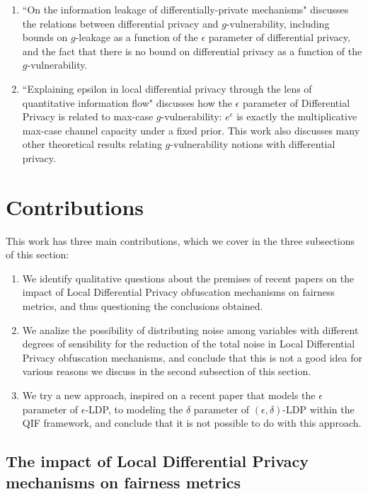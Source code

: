 \documentclass[conference]{IEEEtran}
\newcommand{\qm}[1]{``#1"}
\begin{document}
\begin{enumerate}
	\item \qm{On the information leakage of differentially-private mechanisms} \cite{alvim2015information} discusses the relations between differential privacy and $g$-vulnerability, including bounds on $g$-leakage as a function of the $\epsilon$ parameter of differential privacy, and the fact that there is no bound on differential privacy as a function of the $g$-vulnerability.
	\item \qm{Explaining epsilon in local differential privacy through the lens of quantitative information flow} \cite{fernandes2022explaining} discusses how the $\epsilon$ parameter of Differential Privacy is related to max-case $g$-vulnerability: $e^\epsilon$ is exactly the multiplicative max-case channel capacity under a fixed prior. This work also discusses many other theoretical results relating $g$-vulnerability notions with differential privacy.
\end{enumerate}

\section{Contributions}
This work has three main contributions, which we cover in the three subsections of this section:

\begin{enumerate}
	\item We identify qualitative questions about the premises of recent papers on the impact of Local Differential Privacy obfuscation mechanisms on fairness metrics, and thus questioning the conclusions obtained.
	\item We analize the possibility of distributing noise among variables with different degrees of sensibility for the reduction of the total noise in Local Differential Privacy obfuscation mechanisms, and conclude that this is not a good idea for various reasons we discuss in the second subsection of this section.
	\item We try a new approach, inspired on a recent paper \cite{fernandes2022explaining} that models the $\epsilon$ parameter of $\epsilon$-LDP, to modeling the $\delta$ parameter of $(\epsilon, \delta)$-LDP within the QIF framework, and conclude that it is not possible to do with this approach.
\end{enumerate}

\subsection{The impact of Local Differential Privacy mechanisms on fairness metrics}\label{subsec:ldpunfair}
\end{document}
